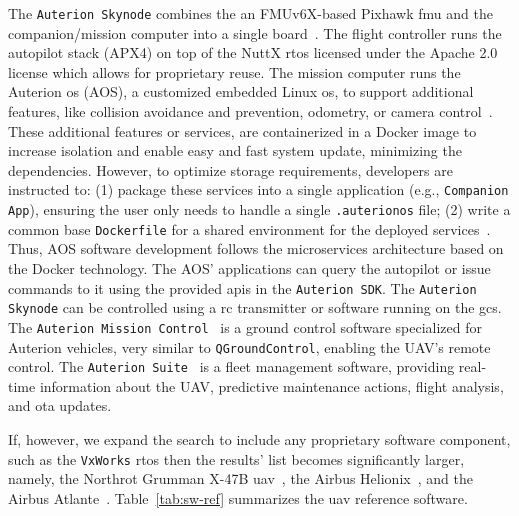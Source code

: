 The \lstinline{Auterion Skynode} combines the an FMUv6X-based Pixhawk
\gls{fmu} and the companion/mission computer into a single board~\cite{auterion-sw}. The flight
controller runs the autopilot stack (APX4) on top of the NuttX \gls{rtos}
licensed under the Apache 2.0 license which allows for proprietary reuse. The
mission computer runs the Auterion \gls{os} (AOS), a customized embedded Linux
\gls{os}, to support additional features, like collision avoidance and
prevention, odometry, or camera control~\cite{auterion-sw}. These additional features or services,
are containerized in a Docker image to increase isolation and enable easy and
fast system update, minimizing the dependencies. However, to optimize storage
requirements, developers are instructed to: (1) package these services into a
single application (e.g., \lstinline{Companion App}), ensuring the user only needs to handle a single
\lstinline{.auterionos} file; (2) write a common base \lstinline{Dockerfile} for
a shared environment for the deployed services~\cite{auterion-sw-services}. Thus, AOS software development
follows the microservices architecture based on the Docker technology.
The AOS' applications can query the autopilot or issue commands to it using the
provided \glspl{api} in the \lstinline{Auterion SDK}.
%
The \lstinline{Auterion Skynode} can be controlled using a \gls{rc} transmitter
or software running on the \gls{gcs}. The \lstinline{Auterion Mission Control}~\cite{auterion-missionControl}
is a ground control software specialized for Auterion vehicles, very similar to
\lstinline{QGroundControl}, enabling the UAV's remote control.
The \lstinline{Auterion Suite}~\cite{auterion-suite} is a fleet management software, providing
real-time information about the UAV, predictive maintenance actions, flight
analysis, and \gls{ota} updates.

If, however, we expand the search to include any proprietary
software component, such as the \lstinline{VxWorks} \gls{rtos} then the results'
list becomes significantly larger, namely, the Northrot Grumman X-47B
\gls{uav}~\cite{vxWorks-uav-northrop}, the Airbus
Helionix~\cite{vxWorks-uav-aribus-helionic}, and the Airbus
Atlante~\cite{vxWorks-uav-aribus-atlante}.
%
Table~\ref{tab:sw-ref} summarizes the \gls{uav} reference software.




